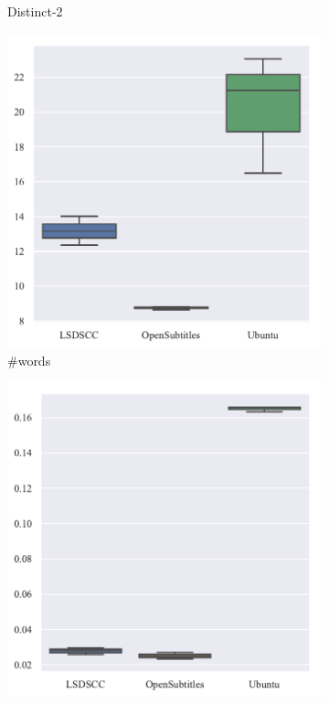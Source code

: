 \begin{figure}[H]
\begin{subfigure}{0.25\linewidth}
        \caption{Distinct-2}
    \end{subfigure}
    \begin{subfigure}{0.25\linewidth}
        \centering
        \includegraphics[width=\linewidth]{figure/boxplot/dataset/utterance_len/plot.pdf}
        \caption{\#words}
    \end{subfigure}%
    \begin{subfigure}{0.25\linewidth}
        \centering
        \includegraphics[width=\linewidth]{figure/boxplot/dataset/meteor/plot.pdf}

\end{subfigure}
\end{figure}

